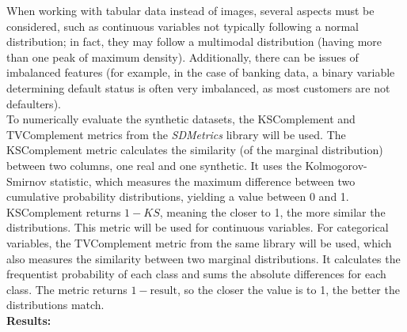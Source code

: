 When working with tabular data instead of images, several aspects must be considered, such as continuous variables not typically following a normal distribution; in fact, they may follow a multimodal distribution (having more than one peak of maximum density). Additionally, there can be issues of imbalanced features (for example, in the case of banking data, a binary variable determining default status is often very imbalanced, as most customers are not defaulters).\\
To numerically evaluate the synthetic datasets, the KSComplement and TVComplement metrics from the \textit{SDMetrics} library will be used. The KSComplement metric calculates the similarity (of the marginal distribution) between two columns, one real and one synthetic. It uses the Kolmogorov-Smirnov statistic, which measures the maximum difference between two cumulative probability distributions, yielding a value between 0 and 1. KSComplement returns $1-KS$, meaning the closer to 1, the more similar the distributions. This metric will be used for continuous variables. For categorical variables, the TVComplement metric from the same library will be used, which also measures the similarity between two marginal distributions. It calculates the frequentist probability of each class and sums the absolute differences for each class. The metric returns $1-\text{result}$, so the closer the value is to 1, the better the distributions match.\\

\textbf{Results:}


